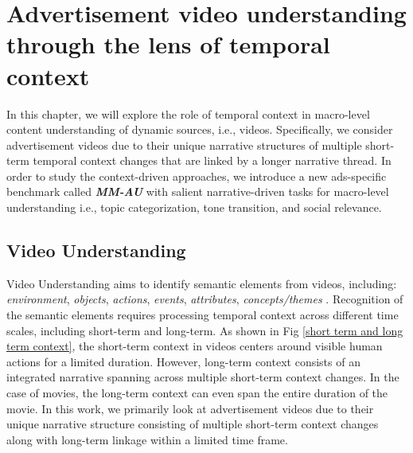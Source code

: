 \chapter{Advertisement video understanding through the lens of temporal context}

In this chapter, we will explore the role of temporal context in macro-level content understanding of dynamic sources, i.e., videos. Specifically, we consider advertisement videos due to their unique narrative structures of multiple short-term temporal context changes that are linked by a longer narrative thread. In order to study the context-driven approaches, we introduce a new ads-specific benchmark called \textbf{\textit{MM-AU}} with salient narrative-driven tasks for macro-level understanding i.e., topic categorization, tone transition, and social relevance. 

\section{Video Understanding}

Video Understanding aims to identify semantic elements from videos, including: \textit{environment}, \textit{objects}, \textit{actions}, \textit{events}, \textit{attributes}, \textit{concepts/themes} \cite{diba_large_2020}. Recognition of the semantic elements requires processing temporal context across different time scales, including short-term and long-term. As shown in Fig \ref{short term and long term context}, the short-term context in videos centers around visible human actions for a limited duration. However, long-term context consists of an integrated narrative spanning across multiple short-term context changes. In the case of movies, the long-term context can even span the entire duration of the movie. In this work, we primarily look at advertisement videos due to their unique narrative structure consisting of multiple short-term context changes along with long-term linkage within a limited time frame.

